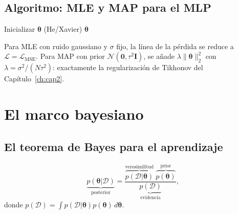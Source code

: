 \subsection{Algoritmo: MLE y MAP para el MLP}
\label{subsec:alg_mle}

\begin{algorithm}[H]
\caption{Entrenamiento por MLE y MAP}
\label{alg:mle_map}
\KwOut{$\hat{\bm{\theta}}$}

Inicializar $\bm{\theta}$ (He/Xavier)\;
\Return $\bm{\theta}$\;
\end{algorithm}

Para MLE con ruido gaussiano y $\sigma$ fijo, la línea de la pérdida se
reduce a $\mathcal{L} = \mathcal{L}_{\text{MSE}}$. Para MAP con prior
$\mathcal{N}(\bm{0},\tau^2\bm{I})$, se añade $\lambda\|\bm{\theta}\|_2^2$
con $\lambda = \sigma^2/(N\tau^2)$: exactamente la regularización de
Tikhonov del Capítulo~\ref{ch:cap2}.

\section{El marco bayesiano}
\label{sec:bayesiano}


\subsection{El teorema de Bayes para el aprendizaje}
\label{subsec:bayes}

\begin{equation}
  \underbrace{p(\bm{\theta}|\mathcal{D})}_{\text{posterior}}
  = \frac{\overbrace{p(\mathcal{D}|\bm{\theta})}^{\text{verosimilitud}}
  \;\overbrace{p(\bm{\theta})}^{\text{prior}}}
  {\underbrace{p(\mathcal{D})}_{\text{evidencia}}},
  \label{eq:bayes}
\end{equation}
donde $p(\mathcal{D}) = \int p(\mathcal{D}|\bm{\theta})
p(\bm{\theta})\,d\bm{\theta}$.

